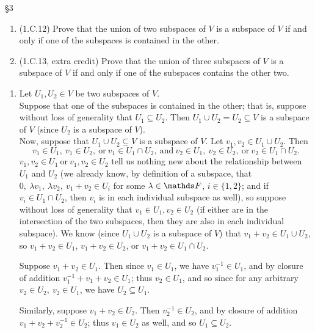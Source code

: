 \documentclass{homework}
\begin{document}
\begin{problem}{\S 3}
  \begin{enumerate}[label=(\alph*)]
    \item (1.C.12) Prove that the union of two subspaces of $V$ is a subspace of $V$ if and only if
      one of the subspaces is contained in the other.
    \item (1.C.13, extra credit) Prove that the union of three subspaces of $V$ is a subspace of $V$ 
      if and only if one of the subspaces contains the other two.
  \end{enumerate}
\end{problem}
\begin{solution}
  \begin{enumerate}[label=(\alph*)]
    \item 
  Let $U_1,U_2\in V$ be two subspaces of $V$.\\

  Suppose that one of the subspaces is contained in the other; that is, suppose without loss of
  generality that $ U_1\subseteq U_2$. Then $ U_1\cup U_2=U_2\subseteq V$ is a subspace of $V$ 
  (since $ U_2$ is a subspace of $V$).\\

  Now, suppose that $ U_1\cup U_2\subseteq V$ is a subspace of $V$. Let $ v_1,v_2\in U_1\cup U_2$.
  Then \[
    v_1\in U_1,\ v_1\in U_2,~\text{or}~v_1\in U_1\cap U_2,~\text{and}~v_2\in U_1,\ v_2\in
    U_2,~\text{or}~v_2\in U_1\cap U_2
  .\] $ v_1,v_2\in U_1~\text{or}~v_1,v_2\in U_2$ tell us nothing new about the relationship between
  $ U_1$ and $U_2$ (we already know, by definition of a subspace, that $0,\ \lambda v_1,\ \lambda
  v_2,\ v_1+v_2\in U_i$ for some $\lambda\in \F$, $i\in \{ 1,2 \}$; and if $v_i\in U_1\cap U_2$,
  then $v_i$ is in each individual subspace as well), so suppose without loss of
  generality that $v_1\in U_1,v_2\in U_2$ (if either are in the intersection of the two subspaces, then
  they are also in each individual subspace). We know (since $ U_1\cup U_2$ is a subspace of $V$) that
  $v_1+v_2\in U_1\cup U_2$, so $ v_1+v_2\in U_1$, $ v_1+v_2\in U_2$, or $ v_1+v_2\in U_1\cap U_2$.
  
  Suppose $ v_1+v_2\in U_1$. Then since  $v_1\in U_1$, we have $ v_1^{-1}\in U_1$, and by closure of
  addition $ v_1^{-1}+v_1+v_2\in U_1$; thus $v_2\in U_1$, and so since for any arbitrary $ v_2\in
  U_2,\ v_2\in U_1$, we have $ U_2\subseteq U_1$.

  Similarly, suppose $v_1+v_2\in U_2$. Then $v_2^{-1}\in U_2$, and by closure of addition
  $v_1+v_2+v_2^{-1}\in U_2$; thus $ v_1\in U_2$ as well, and so $U_1\subseteq U_2$.


\end{enumerate}
\end{solution}
\end{document}
